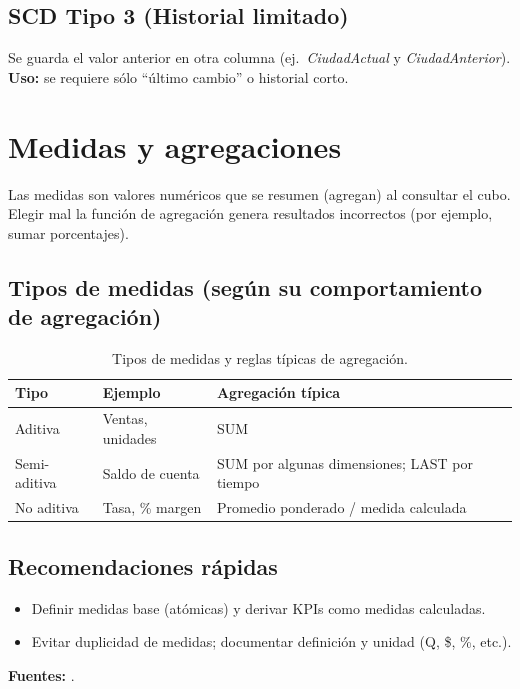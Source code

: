 \documentclass[12pt]{article}
\begin{document}
\subsection*{SCD Tipo 3 (Historial limitado)}
Se guarda el valor anterior en otra columna (ej.\ \textit{CiudadActual} y \textit{CiudadAnterior}). \textbf{Uso:} se requiere sólo ``último cambio'' o historial corto.

\section{Medidas y agregaciones}
Las medidas son valores numéricos que se resumen (agregan) al consultar el cubo. Elegir mal la función de agregación genera resultados incorrectos (por ejemplo, sumar porcentajes).

\subsection*{Tipos de medidas (según su comportamiento de agregación)}
\begin{table}[h]
\centering
\begin{tabular}{@{}p{3cm}p{5.5cm}p{5.5cm}@{}}
\toprule
\textbf{Tipo} & \textbf{Ejemplo} & \textbf{Agregación típica} \\
\midrule
Aditiva & Ventas, unidades & SUM \\
Semi-aditiva & Saldo de cuenta & SUM por algunas dimensiones; LAST por tiempo \\
No aditiva & Tasa, \% margen & Promedio ponderado / medida calculada \\
\bottomrule
\end{tabular}
\caption{Tipos de medidas y reglas típicas de agregación.}
\end{table}

\subsection*{Recomendaciones rápidas}
\begin{itemize}[leftmargin=*, itemsep=0.25em]
  \item Definir medidas base (atómicas) y derivar KPIs como medidas calculadas.
  \item Evitar duplicidad de medidas; documentar definición y unidad (Q, \$, \%, etc.).
\end{itemize}

\noindent\textbf{Fuentes:} \cite{kimballgroup_star_olap, mslearn_star_schema_powerbi}.
\end{document}
